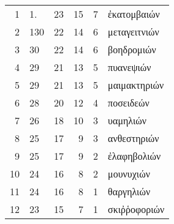 %
\begin{tabular}{r|llrr|l}
 1 & 1.   & 23 & 15 & 7 &\textgreek{ἐκατομβαιών} \\
 2 & 1\textbar{}30 & 22 & 14 & 6 &\textgreek{μεταγειτνιών} \\
 3 & 30   & 22 & 14 & 6 &\textgreek{βοηδρομιών} \\
 4 & 29   & 21 & 13 & 5 &\textgreek{πυανεψιών} \\
 5 & 29   & 21 & 13 & 5 &\textgreek{μαιμακτηριών} \\
 6 & 28   & 20 & 12 & 4 &\textgreek{ποσειδεών} \\
 7 & 26   & 18 & 10 & 3 &\textgreek{υαμηλιών} \\
 8 & 25   & 17 &  9 & 3 &\textgreek{ανθεστηριών} \\
 9 & 25   & 17 &  9 & 2 &\textgreek{ἐλαφηβολιών} \\
10 & 24   & 16 &  8 & 2 &\textgreek{μουνυχιών} \\
11 & 24   & 16 &  8 & 1 &\textgreek{θαργηλιών} \\
12 & 23   & 15 &  7 & 1 &\textgreek{σκιῤῥοφοριών} \\
\end{tabular}
%
